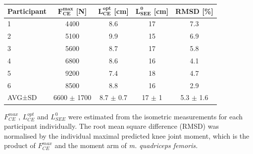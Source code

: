 \begin{tabular}{|l|c|c|c|c|} \hline
 \bfseries Participant & $\bm{F_{CE}^{max}}$ [N] & $\bm{L_{CE}^{opt}}$ [cm] & $\bm{L_{SEE}^{0}}$ [cm] & \bfseries RMSD [\%] \\ \hline
1 & 4400 & 8.6 & 17 & 7.3 \\ \hline
2 & 5100 & 9.9 & 15 & 6.9 \\ \hline
3 & 5600 & 8.7 & 17 & 5.8 \\ \hline
4 & 6800 & 8.6 & 16 & 4.1 \\ \hline
5 & 9200 & 7.4 & 18 & 4.7 \\ \hline
6 & 8500 & 8.8 & 16 & 2.9 \\ \hline
AVG±SD & 6600 $\pm$ 1700 & 8.7 $\pm$ 0.7 & 17 $\pm$ 1 & 5.3 $\pm$ 1.6 \\ \hline
\end{tabular}\break\hfill\footnotesize{$F_{CE}^{max}$, $L_{CE}^{opt}$ and $L_{SEE}^{0}$ were estimated from the isometric measurements for each participant individually. The root mean square difference (RMSD) was normalised by the individual maximal predicted knee joint moment, which is the product of $F_{CE}^{max}$ and the moment arm of \textit{m. quadriceps femoris.}}